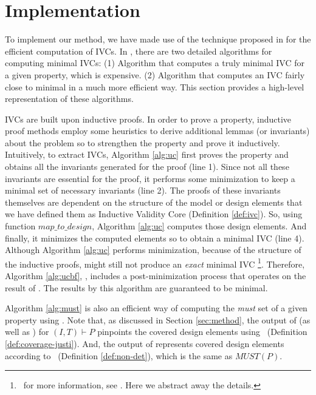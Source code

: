 \section{Implementation}
\label{sec:impl}

To implement our method, we have made use of the technique proposed in \cite{Ghass16} for the efficient computation of IVCs.
In \cite{Ghass16}, there are two detailed algorithms for computing minimal IVCs: (1) Algorithm \ucbfalg that computes a truly minimal IVC for a given property, which is expensive. (2) Algorithm \ucalg that computes an IVC fairly close to minimal in a much more efficient way. This section provides a high-level representation of these algorithms.

IVCs are built upon inductive proofs. In order to prove a property, inductive proof methods employ some heuristics to derive additional lemmas (or invariants) about the problem so to strengthen the property and prove it inductively. Intuitively, to extract IVCs, Algorithm \ref{alg:uc}
first proves the property and obtains all the invariants generated for the proof (line 1). Since not all these invariants are essential for the proof, it performs some minimization to keep a minimal set of necessary invariants (line 2). The proofs of these invariants themselves are dependent on the structure of the model or design elements that we have defined them as Inductive Validity Core (Definition \ref{def:ivc}).
So, using function $map\_to\_design$, Algorithm \ref{alg:uc}
computes those design elements. And finally, it minimizes the computed elements so to obtain a minimal IVC (line 4). Although Algorithm \ref{alg:uc} performs minimization, because of the structure of the inductive proofs, \ucalg might still not produce an \emph{exact} minimal IVC \footnote{\noindent ~for more information, see \cite{Ghass16}. Here we abstract away the details.}.
Therefore, Algorithm \ref{alg:ucbf}, \ucbfalg, includes a post-minimization process that
operates on the result of \ucalg. The results by this algorithm are guaranteed to be minimal.

Algorithm \ref{alg:must} is also an efficient way of computing the \emph{must} set of a given property using \ucalg. Note that, as discussed in Section \ref{sec:method}, the
output of \ucalg (as well as \ucbfalg) for $(I, T) \vdash P$ pinpoints the covered design elements
using \ivccov\ (Definition \ref{def:coverage-justi}).
And, the output of \mustalg represents covered design elements according to \nondetcov\ (Definition \ref{def:non-det}), which is the same as $MUST(P)$.

